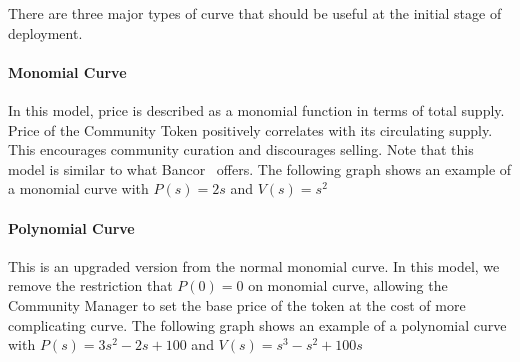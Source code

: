 \documentclass[letterpaper,11pt]{article}
\begin{document}
There are three major types of curve that should be useful at the initial stage of deployment.
\paragraph{Monomial Curve} In this model, price is described as a monomial function in terms of total supply. Price of the Community Token positively correlates with its circulating supply. This encourages community curation and discourages selling. Note that this model is similar to what Bancor~\cite{bancorwhitepaper} offers. The following graph shows an example of a monomial curve with $P(s) = 2s$ and $V(s) = s^2$

\begin{center}
\end{center}

\paragraph{Polynomial Curve} This is an upgraded version from the normal monomial curve. In this model, we remove the restriction that $P(0) = 0$ on monomial curve, allowing the Community Manager to set the base price of the token at the cost of more complicating curve. The following graph shows an example of a polynomial curve with $P(s) = 3s^2 - 2s + 100$ and $V(s) = s^3 - s^2 + 100s$

\begin{center}
\end{center}
\end{document}
